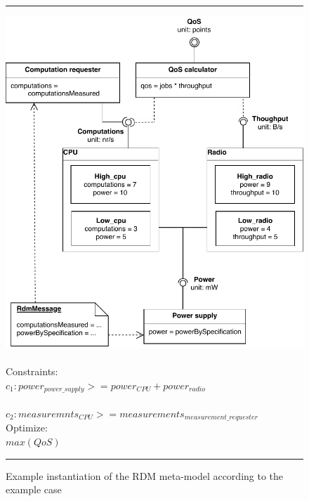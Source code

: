 \begin{figure}
\hrule
\begingroup\centering
  \includegraphics[width=\linewidth]{resources/img/rdm_cpu_radio.pdf}\endgroup \\ \\
  \noindent Constraints: \\
$c_1: power_{power\_supply} >= power_{CPU}+power_{radio} $ \\ \\
$c_2: measuremnts_{CPU} >= measurements_{measurement\_requester}$ \\
\noindent Optimize:\\$max(QoS)$\\
\hrule
\caption{Example instantiation of the RDM meta-model according to the example case}
  \label{fig:rdm_cpu_radio}
\end{figure}

